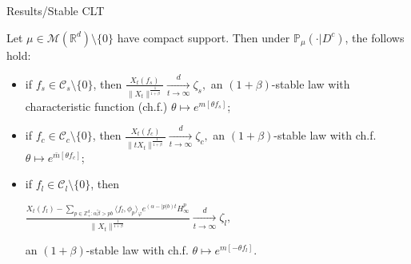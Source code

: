 \documentclass[xcolor=dvipsnames]{beamer}
\begin{document}
\begin{frame}{Results/Stable CLT}
\begin{theorem}
    Let $\mu\in \mathcal M(\mathbb R^d)\setminus \{0\}$ have compact support. Then under $\mathbb{P}_{\mu}(\cdot|D^c)$, the follows hold:
\begin{itemize}
\item
  if $f_s\in \mathcal C_s\setminus\{0\}$, then 
  \( \displaystyle  
    \frac{X_t(f_s)}{\|X_t\|^{\frac{1}{1+\beta}}}
    \xrightarrow[t\to \infty]{d} \zeta_s,\)
    an $(1+\beta)$-stable law with characteristic function (ch.f.) $\theta \mapsto e^{m[\theta f_s]}$; 
\item
  if $f_c\in \mathcal C_c\setminus\{0\}$, then
  \( \displaystyle
    \frac{X_t(f_c)}{\|t X_t\|^{\frac{1}{1+\beta}}}
    \xrightarrow[t\to \infty]{d} 
    \zeta_c,
    \)
    an $(1+\beta)$-stable law with ch.f. $\theta \mapsto e^{\bar m[\theta f_c]}$;
  \item
    if $f_l\in \mathcal C_l\setminus\{0\}$, then
    \centerline{ \( \displaystyle
    \frac{X_t(f_l) - \sum_{p\in \mathbb Z^d_+:\alpha \tilde \beta>pb}\langle f_l,\phi_p\rangle_\varphi e^{(\alpha-|p|b)t}H^p_{\infty} }{\|X_t\|^{\frac{1}{1+\beta}}}
    \xrightarrow[t\to \infty]{d}
    \zeta_l,
    \)}
    an $(1+\beta)$-stable law with ch.f. $\theta \mapsto e^{m[- \theta f_l]}$.
\end{itemize}
\end{theorem}
\end{frame}
\end{document}
